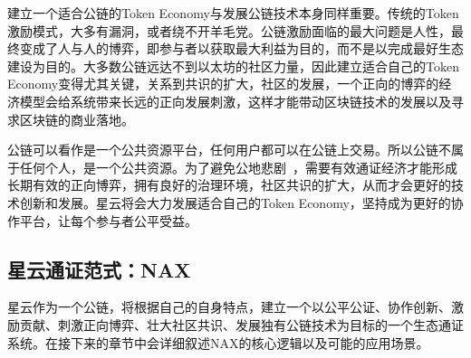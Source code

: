建立一个适合公链的Token Economy与发展公链技术本身同样重要。传统的Token激励模式，大多有漏洞，或者绕不开羊毛党。公链激励面临的最大问题是人性，最终变成了人与人的博弈，即参与者以获取最大利益为目的，而不是以完成最好生态建设为目的。大多数公链远达不到以太坊的社区力量，因此建立适合自己的Token Economy变得尤其关键，关系到共识的扩大，社区的发展，一个正向的博弈的经济模型会给系统带来长远的正向发展刺激，这样才能带动区块链技术的发展以及寻求区块链的商业落地。

公链可以看作是一个公共资源平台，任何用户都可以在公链上交易。所以公链不属于任何个人，是一个公共资源。为了避免公地悲剧~\cite{TragedyOfTheCommons}，需要有效通证经济才能形成长期有效的正向博弈，拥有良好的治理环境，社区共识的扩大，从而才会更好的技术创新和发展。星云将会大力发展适合自己的Token Economy，坚持成为更好的协作平台，让每个参与者公平受益。

\subsection{星云通证范式：NAX}
星云作为一个公链，将根据自己的自身特点，建立一个以公平公证、协作创新、激励贡献、刺激正向博弈、壮大社区共识、发展独有公链技术为目标的一个生态通证系统。在接下来的章节中会详细叙述NAX的核心逻辑以及可能的应用场景。